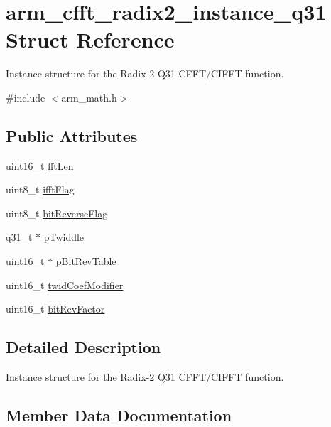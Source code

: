 \hypertarget{structarm__cfft__radix2__instance__q31}{}\section{arm\+\_\+cfft\+\_\+radix2\+\_\+instance\+\_\+q31 Struct Reference}
\label{structarm__cfft__radix2__instance__q31}


Instance structure for the Radix-\/2 Q31 C\+F\+F\+T/\+C\+I\+F\+FT function.  




{\ttfamily \#include $<$arm\+\_\+math.\+h$>$}

\subsection*{Public Attributes}
\begin{DoxyCompactItemize}
\item 
uint16\+\_\+t \hyperlink{structarm__cfft__radix2__instance__q31_a960199f1373a192366878ef279eab00f}{fft\+Len}
\item 
uint8\+\_\+t \hyperlink{structarm__cfft__radix2__instance__q31_a2607378ce64be16698bb8a3b1af8d3c8}{ifft\+Flag}
\item 
uint8\+\_\+t \hyperlink{structarm__cfft__radix2__instance__q31_a6239b8d268285334e88c008c07d68616}{bit\+Reverse\+Flag}
\item 
q31\+\_\+t $\ast$ \hyperlink{structarm__cfft__radix2__instance__q31_a1d5bbe9a991e133f81652a77a7985d23}{p\+Twiddle}
\item 
uint16\+\_\+t $\ast$ \hyperlink{structarm__cfft__radix2__instance__q31_ada8e5264f4b22ff4c621817978994674}{p\+Bit\+Rev\+Table}
\item 
uint16\+\_\+t \hyperlink{structarm__cfft__radix2__instance__q31_ae63ca9193322cd477970c1d2086407d1}{twid\+Coef\+Modifier}
\item 
uint16\+\_\+t \hyperlink{structarm__cfft__radix2__instance__q31_a9d17a87263953fe3559a007512c9f3a4}{bit\+Rev\+Factor}
\end{DoxyCompactItemize}


\subsection{Detailed Description}
Instance structure for the Radix-\/2 Q31 C\+F\+F\+T/\+C\+I\+F\+FT function. 

\subsection{Member Data Documentation}
